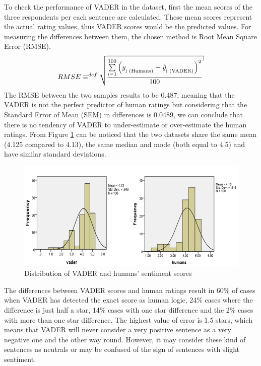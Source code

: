 To check the performance of VADER in the dataset, first the mean scores of the three respondents per each sentence are calculated. These mean scores represent the actual rating values, thus VADER scores would  be the predicted values.  For measuring the differences between them, the chosen method is Root Mean Square Error (RMSE).
\begin{equation}
 RMSE \equiv^{def} \sqrt {{\frac{{\sum\limits_{{i = 1}}^{100} {{{\left( {{y_\textsubscript{i (Humans)}} - {{\hat{y}}_\textsubscript{i (VADER)}}} \right)}^2}} }}{{100}}}}
 \label{RMSE}
\end{equation}
The RMSE between the two samples results to be 0.487, meaning that the VADER is not the perfect predictor of human ratings but considering that the Standard Error of Mean (SEM) in differences is 0.0489, we can conclude that there is no tendency of VADER to under-estimate or over-estimate the human ratings. From Figure \ref{fig:distribution} can be noticed that the two datasets share the same mean (4.125 compared to 4.13), the same median and mode (both equal to 4.5) and have similar standard deviations. 
\begin{figure}[h!]
	\centering
	\includegraphics[height=0.33\textheight]{graphs_vader_humans}
	\caption{Distribution of VADER and humans' sentiment scores}
	\label{fig:distribution}
\end{figure}

The differences between VADER scores and human ratings result in 60\% of cases when VADER has detected the exact score as human logic, 24\% cases where the difference is just half a star, 14\% cases with one star difference and the 2\% cases with more than one star difference. The highest value of error is 1.5 stars, which means that VADER will never consider a very positive sentence as a very negative one and the other way round. However, it may consider these kind of sentences as neutrals or may be confused of the sign of sentences with slight sentiment.

